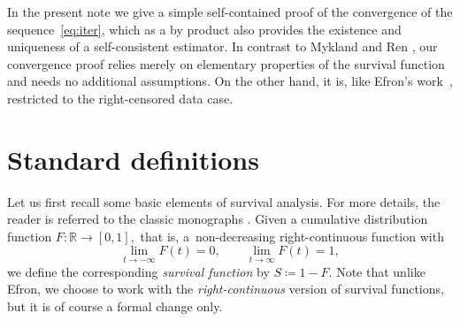 \documentclass{amsart}
\theoremstyle{plain}
\theoremstyle{definition}
\def\as{\coloneqq}
\def\rls{\mathbb{R}}
\def\col{\colon}
\begin{document}
In the present note we give a simple self-contained proof of the convergence of the sequence~\eqref{eq:iter}, which as a by product also provides the existence and uniqueness of a self-consistent estimator. In contrast to Mykland and Ren \cite{mykland-ren}, our convergence proof relies merely on elementary properties of the survival function and needs no additional assumptions. On the other hand, it is, like Efron's work~\cite{efron}, restricted to the right-censored data case.





\section{Standard definitions} \label{sec:definitions}

Let us first recall some basic elements of survival analysis. For more details, the reader is referred to the classic monographs \cite{andersen-et-al,fleming-harrington,martinussen-scheike}. Given a cumulative distribution function $F\col\rls\to[0,1],$ that is, a~non-decreasing right-continuous function with
 \begin{equation*}
  \lim_{t\to-\infty} F(t)=0,\qquad \lim_{t\to\infty} F(t)=1,
 \end{equation*}
we define the corresponding \emph{survival function} by $S\as 1-F.$ Note that unlike Efron, we choose to work with the \emph{right-continuous} version of survival functions, but it is of course a formal change only.
\end{document}
